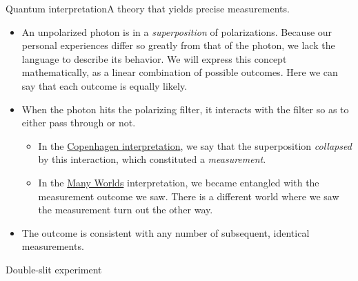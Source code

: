 \begin{frame}{Quantum interpretation}{A theory that yields precise measurements.}
\begin{itemize}
    \item An unpolarized photon is in a \emph{superposition} of polarizations.  Because our personal experiences differ so greatly from that of the photon, we lack the language to describe its behavior.  We will express this concept mathematically, as a linear combination of possible outcomes.  Here we can say that each outcome is equally likely.
    \item When the photon hits the polarizing filter, it interacts with the filter so as to either pass through or not.
    \begin{itemize}
        \item In the \href{https://en.wikipedia.org/wiki/Copenhagen_interpretation}{Copenhagen interpretation}, we say that the superposition \emph{collapsed} by this interaction, which constituted a \emph{measurement}.
        \item In the \href{https://en.wikipedia.org/wiki/Many-worlds_interpretation}{Many Worlds} interpretation, we became entangled with the measurement outcome we saw.  There is a different world where we saw the measurement turn out the other way.
    \end{itemize}
    \item The outcome is consistent with any number of subsequent, identical measurements.
    
\end{itemize}
\end{frame}

\begin{frame}{Double-slit experiment}
\end{frame}